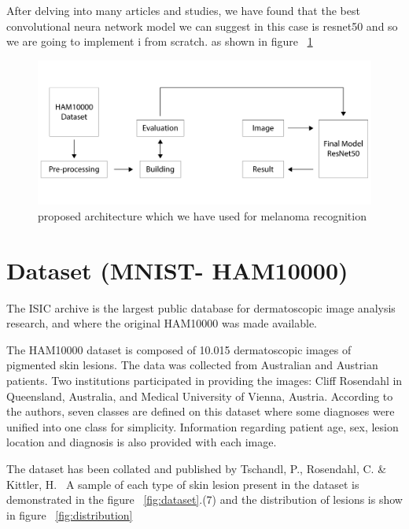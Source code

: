     After delving into many articles and studies, we have found that the best convolutional neura network model we can suggest in this case is resnet50 and so we are going to implement i from scratch. as shown in figure ~\ref{fig:architecture}

    \begin{figure}[htbp]
    \begin{center}
    \includegraphics[width=15cm]{./chapter-05-our-contribution/3.png}
    \end{center}
    \caption{proposed architecture which we have used for melanoma recognition}
    \label{fig:architecture}
    \end{figure}

\section{Dataset (MNIST- HAM10000)}

    The ISIC archive is the largest public database for dermatoscopic image analysis research, and where the original HAM10000 was made available.~\cite{JULIANA2021}

    The HAM10000 dataset is composed of 10.015 dermatoscopic images of pigmented skin lesions. The data was collected from Australian and Austrian patients. Two institutions participated in providing the images: Cliff Rosendahl in Queensland, Australia, and Medical University of Vienna, Austria. According to the authors, seven classes are defined on this dataset where some diagnoses were unified into one class for simplicity. Information regarding patient age, sex, lesion location and diagnosis is also provided with each image. ~\cite{JULIANA2021}


    The dataset has been collated and published by Tschandl, P., Rosendahl, C. \& Kittler, H.~\cite{JULIANA2021} A sample of each type of skin lesion present in the dataset is demonstrated in the figure ~\ref{fig:dataset}.(7) and the distribution of lesions is show in figure ~\ref{fig:distribution}

